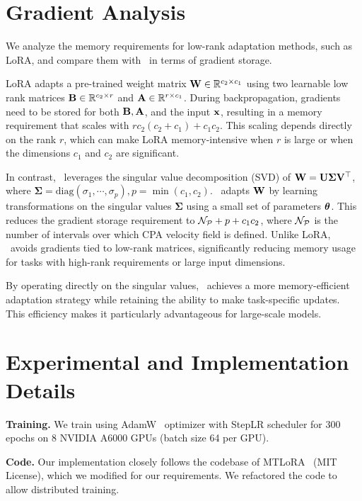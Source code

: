 \section{Gradient Analysis}
We analyze the memory requirements for low-rank adaptation methods, such as LoRA, and compare them with \ourmethod\ in terms of gradient storage.

LoRA adapts a pre-trained weight matrix ${\mathbf{W}} \in {\mathbb{R}}^{c_2 \times c_1}$ using two learnable low rank matrices ${\mathbf{B}} \in {\mathbb{R}}^{c_2 \times r}$ and ${\mathbf{A}} \in {\mathbb{R}}^{r \times c_1}$. During backpropagation, gradients need to be stored for both ${\mathbf{B}}, {\mathbf{A}}$, and the input ${\mathbf{x}}$, resulting in a memory requirement that scales with $rc_2(c_2+c_1) + c_1 c_2$. This scaling depends directly on the rank $r$, which can make LoRA memory-intensive when $r$ is large or when the dimensions $c_1$ and $c_2$ are significant.

In contrast, \ourmethod\ leverages the singular value decomposition (SVD) of ${\mathbf{W}} = {\mathbf{U}} \mathbf{\Sigma}{\mathbf{V}}^\top$, where $\mathbf{\Sigma} = \text{diag}(\sigma_1, \cdots, \sigma_p), p=\min(c_1, c_2)$. \ourmethod\ adapts ${\mathbf{W}}$ by learning transformations on the singular values $\mathbf{\Sigma}$ using a small set of parameters ${\bm{\theta}}$. This reduces the gradient storage requirement to ${\mathcal{N}}_{\mathcal{P}} + p + c_1 c_2$, where ${\mathcal{N}}_{\mathcal{P}}$ is the number of intervals over which CPA velocity field is defined. Unlike LoRA, \ourmethod\ avoids gradients tied to low-rank matrices, significantly reducing memory usage for tasks with high-rank requirements or large input dimensions.

By operating directly on the singular values, \ourmethod\ achieves a more memory-efficient adaptation strategy while retaining the ability to make task-specific updates. This efficiency makes it particularly advantageous for large-scale models.


\section{Experimental and Implementation Details}
\label{sec:appendix:hyper}
\noindent\textbf{Training.} We train using AdamW~\citep{loshchilov2019decoupledweightdecayregularization} optimizer with StepLR scheduler for 300 epochs on 8 NVIDIA A6000 GPUs (batch size 64 per GPU).

\noindent\textbf{Code.} Our implementation closely follows the codebase of MTLoRA~\citep{agiza2024mtlora} (MIT License), which we modified for our requirements. We refactored the code to allow distributed training.

